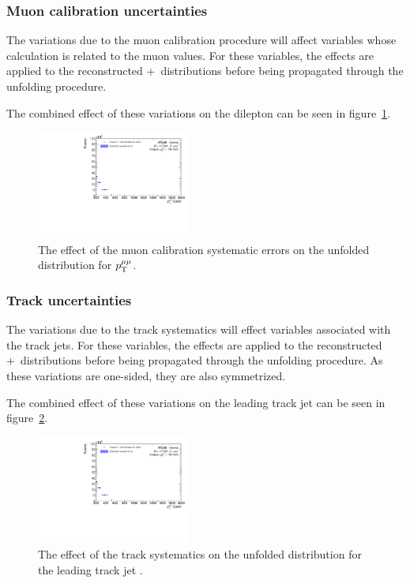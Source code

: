 \subsubsection{Muon calibration uncertainties}
The variations due to the muon calibration procedure will affect variables whose calculation is related to the muon \pt values. For these variables, the effects are applied to the reconstructed \powheg+\pythia~distributions before being propagated through the unfolding procedure.

The combined effect of these variations on the dilepton \pt can be seen in figure~\ref{fig:muCalSystErr}.

\begin{figure}[h!]
  \centering
  \includegraphics[page=25,width=0.45\textwidth]{figures/unfoldErrPlots.pdf}
  \caption{The effect of the muon calibration systematic errors on the unfolded distribution for $p_\mathrm{T}^{\mu\mu}$.}
  \label{fig:muCalSystErr}
\end{figure}

\subsubsection{Track uncertainties}
The variations due to the track systematics will effect variables associated with the track jets. For these variables, the effects are applied to the reconstructed \powheg+\pythia~distributions before being propagated through the unfolding procedure. As these variations are one-sided, they are also symmetrized.

The combined effect of these variations on the leading track jet \pt can be seen in figure~\ref{fig:trackSystErr}.

\begin{figure}[h!]
  \centering
  \includegraphics[page=261,width=0.45\textwidth]{figures/unfoldErrPlots.pdf}
  \caption{The effect of the track systematics on the unfolded distribution for the leading track jet \pt.}
  \label{fig:trackSystErr}
\end{figure}

